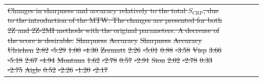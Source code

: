 \documentclass[hess, manuscript]{copernicus}
\providecommand{\DIFdel}[1]{{\protect\color{red}\sout{#1}}}                      %
\providecommand{\DIFdelFL}[1]{\DIFdel{#1}} %
\begin{document}
\begin{table}[htb]
\begin{center}
\begin{tabular}{l c c c c}
{%
\DIFdelFL{Changes in sharpness and accuracy relatively to the total $S_{\text{CRP}}$, due to the introduction of the MTW. The changes are presented for both 2Z and 2Z-2MI methods with the original parameters. A decrease of the score is desirable.}}
\DIFdelFL{Sharpness }%
\DIFdelFL{Accuracy }%
\DIFdelFL{Sharpness }%
\DIFdelFL{Accuracy }%
\DIFdelFL{Ulrichen }%
\DIFdelFL{2.82 }%
\DIFdelFL{-5.29 }%
\DIFdelFL{1.00 }%
\DIFdelFL{-4.30 }%
\DIFdelFL{Zermatt }%
\DIFdelFL{2.26 }%
\DIFdelFL{-5.01 }%
\DIFdelFL{0.88 }%
\DIFdelFL{-3.58 }%
\DIFdelFL{Visp }%
\DIFdelFL{3.66 }%
\DIFdelFL{-5.18 }%
\DIFdelFL{2.67 }%
\DIFdelFL{-4.94 }%
\DIFdelFL{Montana }%
\DIFdelFL{1.62 }%
\DIFdelFL{-2.78 }%
\DIFdelFL{0.57 }%
\DIFdelFL{-2.91 }%
\DIFdelFL{Sion }%
\DIFdelFL{2.02 }%
\DIFdelFL{-2.78 }%
\DIFdelFL{0.33 }%
\DIFdelFL{-2.75 }%
\DIFdelFL{Aigle }%
\DIFdelFL{0.52 }%
\DIFdelFL{-2.26 }%
\DIFdelFL{-1.20 }%
\DIFdelFL{-2.17 }%


\end{tabular}
\end{center}
\end{table}
\end{document}
